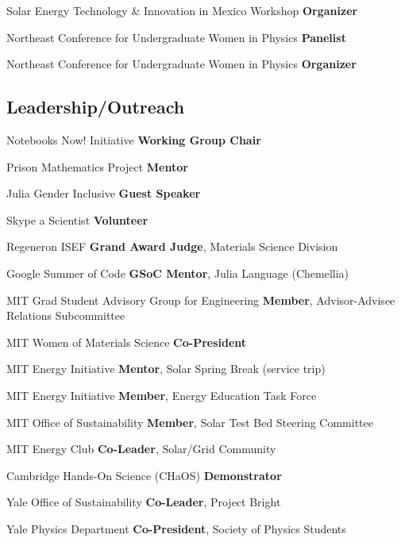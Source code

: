 {Solar Energy Technology \& Innovation in Mexico Workshop}
{\textbf{Organizer}}
{}

{Northeast Conference for Undergraduate Women in Physics}
{\textbf{Panelist}}
{}

{Northeast Conference for Undergraduate Women in Physics}
{\textbf{Organizer}}
{}

\subsection{Leadership/Outreach}

{Notebooks Now! Initiative}
{\textbf{Working Group Chair}}
{}

{Prison Mathematics Project}
{\textbf{Mentor}}
{}

{Julia Gender Inclusive}
{\textbf{Guest Speaker}}
{}

{Skype a Scientist}
{\textbf{Volunteer}}
{}

{Regeneron ISEF}
{\textbf{Grand Award Judge}, Materials Science Division}
{}

{Google Summer of Code}
{\textbf{GSoC Mentor}, Julia Language (Chemellia)}
{}

{MIT Grad Student Advisory Group for Engineering}
{\textbf{Member}, Advisor-Advisee Relations Subcommittee}
{}

{MIT Women of Materials Science}
{\textbf{Co-President}}
{}

{MIT Energy Initiative}
{\textbf{Mentor}, Solar Spring Break (service trip)}
{}

{MIT Energy Initiative}
{\textbf{Member}, Energy Education Task Force}
{}

{MIT Office of Sustainability}
{\textbf{Member}, Solar Test Bed Steering Committee}
{}

{MIT Energy Club}
{\textbf{Co-Leader}, Solar/Grid Community}
{}

{Cambridge Hands-On Science (CHaOS)}
{\textbf{Demonstrator}}
{}

{Yale Office of Sustainability}
{\textbf{Co-Leader}, Project Bright}
{}

{Yale Physics Department}
{\textbf{Co-President}, Society of Physics Students}
{}
